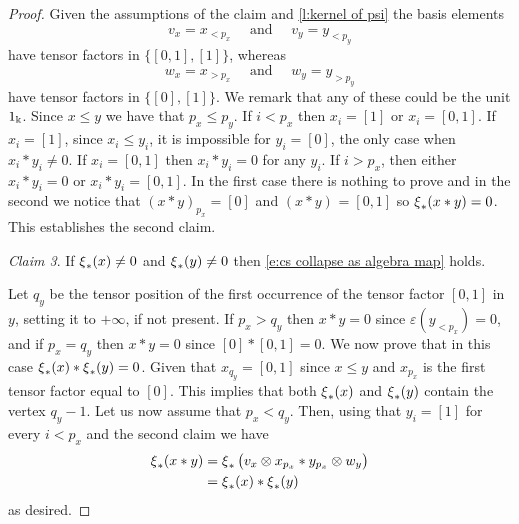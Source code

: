 \begin{proof}
	Given the assumptions of the claim and \cref{l:kernel of psi} the basis elements
	\[
	v_x = x_{< p_x}
	\quad \text{ and } \quad
	v_y = y_{< p_y}
	\]
	have tensor factors in $\big\{ [0,1], [1] \big\}$, whereas
	\[
	w_x = x_{> p_x}
	\quad \text{ and } \quad
	w_y = y_{> p_y}
	\]
	have tensor factors in $\big\{ [0], [1] \big\}$.
	We remark that any of these could be the unit $1_\Bbbk$.
	Since $x \leq y$ we have that $p_x \leq p_y$.
	If $i < p_x$ then $x_i = [1]$ or $x_i = [0,1]$.
	If $x_i = [1]$, since $x_i \leq y_i$, it is impossible for $y_i = [0]$, the only case when $x_i \ast y_i \neq 0$.
	If $x_i = [0,1]$ then $x_i \ast y_i = 0$ for any $y_i$.
	If $i > p_x$, then either $x_i \ast y_i = 0$ or $x_i \ast y_i = [0,1]$.
	In the first case there is nothing to prove and in the second we notice that $(x \ast y)_{p_x} = [0]$ and $(x \ast y)_{} = [0,1]$ so $\operatorname{\xi}_\ast(x \ast y) = 0$.
	This establishes the second claim. \newline

	\noindent \textit{Claim 3}.
	If $\operatorname{\xi}_\ast(x) \neq 0$ and $\operatorname{\xi}_\ast(y) \neq 0$ then \eqref{e:cs collapse as algebra map} holds.

	Let $q_y$ be the tensor position of the first occurrence of the tensor factor $[0,1]$ in $y$, setting it to $+\infty$, if not present.
	If $p_x > q_y$ then $x \ast y = 0$ since $\varepsilon(y_{<p_x}) = 0$, and if $p_x = q_y$ then $x \ast y = 0$ since $[0] \ast [0,1] = 0$.
	We now prove that in this case $\operatorname{\xi}_\ast(x) \ast \operatorname{\xi}_\ast(y) = 0$.
	Given that $x_{q_y} = [0,1]$ since $x \leq y$ and $x_{p_x}$ is the first tensor factor equal to $[0]$.
	This implies that both $\operatorname{\xi}_\ast(x)$ and $\operatorname{\xi}_\ast(y)$ contain the vertex $q_{y} - 1$.
	Let us now assume that $p_x < q_y$.
	Then, using that $y_i = [1]$ for every $i < p_x$ and the second claim we have
	\begin{align*}
	\operatorname{\xi}_\ast(x \ast y) & =
	\operatorname{\xi}_\ast \big( v_x \otimes x_{p_x} \ast y_{p_x} \otimes w_y \big) \\ & =
	\operatorname{\xi}_\ast(x) \ast \operatorname{\xi}_\ast(y)
	\end{align*}
	as desired.
\end{proof}

